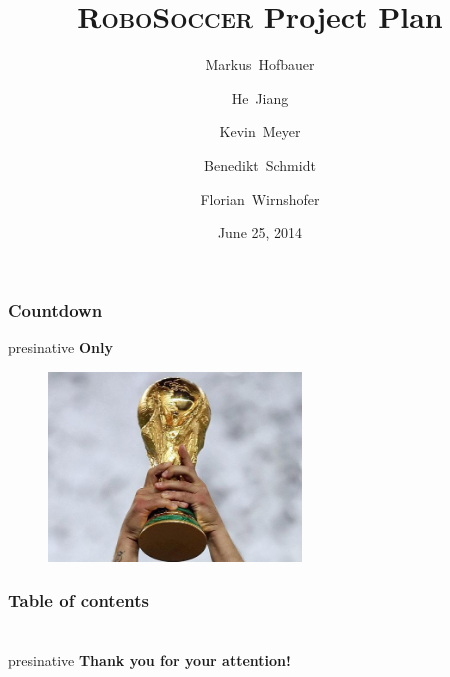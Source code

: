 \documentclass[hyperref={pdfpagelabels=false}]{beamer}
\title{\textsc{RoboSoccer} Project Plan}
\author[Hofbauer, Jiang, Meyer, Schmidt, Wirnshofer]{
  Markus~Hofbauer \and
  He~Jiang \and
  Kevin~Meyer \and
  Benedikt~Schmidt \and
  Florian~Wirnshofer
}
\institute
{
	Technische Universität München, Germany
}
\date{June 25, 2014}
\begin{document}
\begin{frame}
	\titlepage
\end{frame}

\begin{frame}
\frametitle{Countdown}
	\hfill
		\begin{beamercolorbox}[shadow=true, rounded=true, wd=10cm]{presinative}
			\centering
			\Large{\textbf{Only }}
			\Huge {}
			\Large{}
		\end{beamercolorbox}
	\hfill
	\begin{figure}
		\centering
		\includegraphics[width=0.6\textwidth]{Pictures/wm}
	\end{figure}
\end{frame}

\begin{frame}
	\frametitle{Table of contents}
	\tableofcontents
\end{frame}

\section{}
\begin{frame}
	\hfill
	\begin{beamercolorbox}[shadow=true, rounded=true, wd=10cm]{presinative}
		\centering
		\Large{\textbf{Thank you for your attention!}}
	\end{beamercolorbox}
	\hfill
\end{frame}
\end{document}
